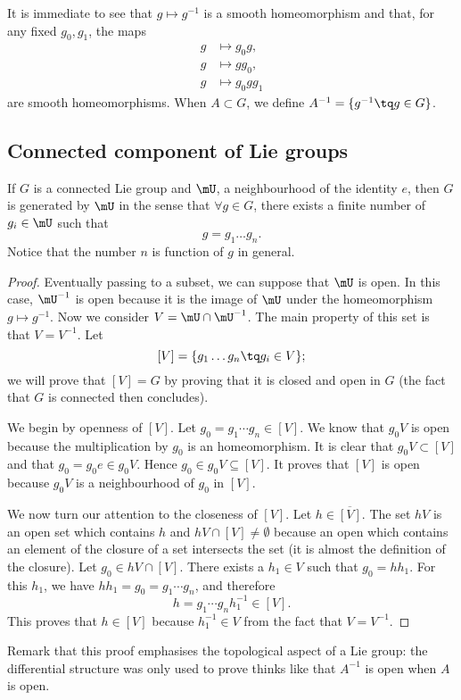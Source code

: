 It is immediate to see that $g\mapsto g^{-1}$ is a smooth homeomorphism and that, for any fixed $g_0, g_1$, the maps
\[
\begin{split}
   g&\mapsto g_0g,\\
g&\mapsto gg_0,\\
g&\mapsto g_0gg_1
\end{split}
\]
are smooth homeomorphisms. When $A\subset G$, we define $A^{-1}=\{ g^{-1}\tq g\in G \}$.

\subsection{Connected component of Lie groups}

\begin{proposition}		\label{PropUssGpGenere} 
If $G$ is a connected Lie group and $\mU$, a neighbourhood of the identity $e$, then $G$ is generated by $\mU$ in the sense that $\forall g\in G$, there exists a finite number of $g_{i}\in \mU$ such that
\begin{equation}
    g=g_1\ldots g_n.
\end{equation}
Notice that the number $n$ is function of $g$ in general.
\end{proposition}

\begin{proof}
Eventually passing to a subset, we can suppose that $\mU$ is open. In this case, $\mU^{-1}$ is open because it is the image of $\mU$ under the homeomorphism $g\mapsto g^{-1}$. Now we consider $V=\mU\cap\mU^{-1}$. The main property of this set is that $V=V^{-1}$. Let
\[
  [V]=\{ g_1\ldots g_n\tq g_{i}\in V \};
\]
we will prove that $[V]=G$ by proving that it is closed and open in $G$ (the fact that $G$ is connected then concludes).

We begin by openness of $[V]$. Let $g_0=g_1\cdots g_n\in[V]$. We know that $g_0V$ is open because the multiplication by $g_0$ is an homeomorphism. It is clear that $g_0V\subset [V]$ and that $g_0=g_0e\in g_0V$. Hence $g_0\in g_0V\subseteq[V]$. It proves that $[V]$ is open because $g_0V$ is a neighbourhood of $g_0$ in $[V]$.

We now turn our attention to the closeness of $[V]$. Let $h\in\overline{ [V] }$. The set $hV$ is an open set which contains $h$ and $hV\cap [V]\neq \emptyset$ because an open which contains an element of the closure of a set intersects the set (it is almost the definition of the closure). Let $g_0\in hV\cap[V]$. There exists a $h_{1}\in V$ such that $g_0=hh_1$. For this $h_1$, we have $hh_1=g_0=g_1\cdots g_n$, and therefore
\[
  h=g_1\cdots g_n h_1^{-1}\in[V].
\]
This proves that $h\in[V]$ because $h_1^{-1}\in V$ from the fact that $V=V^{-1}$.
\end{proof}
 Remark that this proof emphasises the topological aspect of a Lie group: the differential structure was only used to prove thinks like that $A^{-1}$ is open when $A$ is open.

